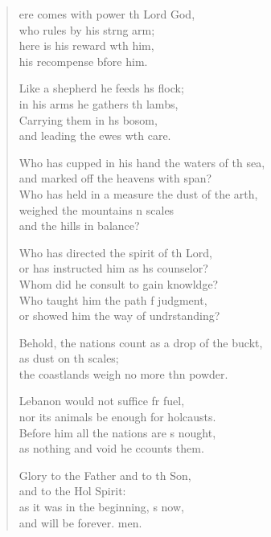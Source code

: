\begin{verse}
  \begin{patverse}
ere comes with power th Lord God,\Med\\
who rules by his strng arm;\\
here is his reward w\pointup{\i}th him,\Med\\
his recompense bfore him.

Like a shepherd he feeds h\pointup{\i}s flock;\Med\\
in his arms he gathers th lambs,\\
Carrying them in h\pointup{\i}s bosom,\Med\\
and leading the ewes w\pointup{\i}th care.

Who has cupped in his hand the waters of th sea,\Med\\
and marked off the heavens with  span?\\
Who has held in a measure the dust of the arth,\Flex\\
weighed the mountains \pointup{\i}n scales\Med\\
and the hills in  balance?

Who has directed the spirit of th Lord,\Med\\
or has instructed him as h\pointup{\i}s counselor?\\
Whom did he consult to gain knowldge?\Flex\\
Who taught him the path f judgment,\Med\\
or showed him the way of undrstanding?

Behold, the nations count as a drop of the buckt,\Flex\\
as dust on th scales;\Med\\
the coastlands weigh no more thn powder.

Lebanon would not suffice fr fuel,\Med\\
nor its animals be enough for holcausts.\\
Before him all the nations are s nought,\Med\\
as nothing and void he ccounts them.

Glory to the Father and to th Son,\Med\\
and to the Hol Spirit:\\
as it was in the beginning, \pointup{\i}s now,\Med\\
and will be forever. men.
  \end{patverse}
\end{verse}

